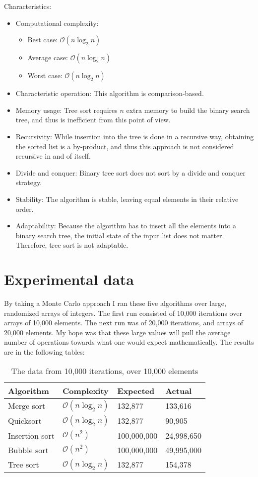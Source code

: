 \documentclass[12pt, a4paper]{article}
\begin{document}
Characteristics:
\begin{itemize}
\item Computational complexity:
\begin{itemize}
\item Best case: $\mathcal{O}(n \log_2 n)$
\item Average case: $\mathcal{O}(n \log_2 n)$
\item Worst case: $\mathcal{O}(n \log_2 n)$
\end{itemize}
\item Characteristic operation: This algorithm is comparison-based.
\item Memory usage: Tree sort requires $n$ extra memory to build the binary search tree, and thus is inefficient from this point of view.
\item Recursivity: While insertion into the tree is done in a recursive way, obtaining the sorted list is a by-product, and thus this approach is not considered recursive in and of itself.
\item Divide and conquer: Binary tree sort does not sort by a divide and conquer strategy.
\item Stability: The algorithm is stable, leaving equal elements in their relative order.
\item Adaptability: Because the algorithm has to insert all the elements into a binary search tree, the initial state of the input list does not matter. Therefore, tree sort is not adaptable.
\end{itemize}
\newpage

\section{Experimental data}

By taking a Monte Carlo approach I ran these five algorithms over large, randomized arrays of integers. The first run consisted of 10,000 iterations over arrays of 10,000 elements. The next run was of 20,000 iterations, and arrays of 20,000 elements. My hope was that these large values will pull the average number of operations towards what one would expect mathematically. The results are in the following tables:

\begin{table}[ht!]
\begin{tabular}{|p{3cm}|p{3cm}|p{3cm}|p{3cm}|}
\hline 
Algorithm & Complexity & Expected & Actual \\ 
\hline 
Merge sort & $\mathcal{O}(n \log_2 n)$ & 132,877 & 133,616 \\ 
\hline 
Quicksort & $\mathcal{O}(n \log_2 n)$ & 132,877 & 90,905 \\ 
\hline 
Insertion sort & $\mathcal{O}(n^2)$ & 100,000,000 & 24,998,650 \\ 
\hline 
Bubble sort & $\mathcal{O}(n^2)$ & 100,000,000 & 49,995,000 \\ 
\hline 
Tree sort & $\mathcal{O}(n \log_2 n)$ & 132,877 & 154,378 \\ 
\hline 
\end{tabular} 
\caption{The data from 10,000 iterations, over 10,000 elements}
\label{table:experimentalData1}
\end{table}
\end{document}
